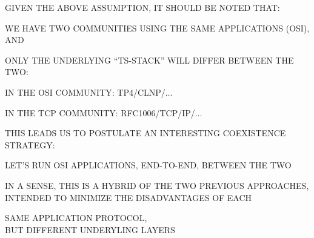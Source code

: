 \begin{bwslide}

\begin{nrtc}
\item	GIVEN THE ABOVE ASSUMPTION, IT SHOULD BE NOTED THAT:
    \begin{nrtc}
    \item	WE HAVE TWO COMMUNITIES USING THE SAME APPLICATIONS
		(OSI), AND

    \item	ONLY THE UNDERLYING ``TS-STACK'' WILL DIFFER BETWEEN THE TWO:
	\begin{nrtc}
	\item	IN THE OSI COMMUNITY: TP4/CLNP/$\ldots$

	\item	IN THE TCP COMMUNITY: RFC1006/TCP/IP/$\ldots$
	\end{nrtc}
    \end{nrtc}

\item	THIS LEADS US TO POSTULATE AN INTERESTING COEXISTENCE
	STRATEGY:
    \begin{nrtc}
    \item	LET'S RUN OSI APPLICATIONS, END-TO-END, BETWEEN THE TWO
    \end{nrtc}

\item	IN A SENSE, THIS IS A HYBRID OF THE TWO PREVIOUS APPROACHES,
	INTENDED TO MINIMIZE THE DISADVANTAGES OF EACH
    \begin{nrtc}
	\item	SAME APPLICATION PROTOCOL,\\
		BUT DIFFERENT UNDERYLING LAYERS
    \end{nrtc}
\end{nrtc}
\end{bwslide}


